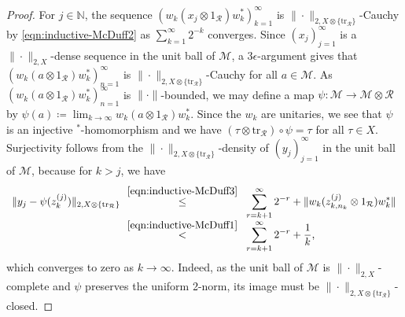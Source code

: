 \documentclass[10pt,a4paper]{amsart}
\newcommand{\M}{\mathcal{M}}
\newcommand{\N}{\mathbb N}
\newcommand{\R}{\mathcal R}
\newcommand{\tr}{\mathrm{tr}}
\begin{document}
\begin{proof}
For $j \in \N$, the sequence $(w_k (x_j \otimes 1_\R) w_k^*)_{k=1}^\infty$ is $\|\cdot\|_{2,X \otimes \{\tr_\R\}}$-Cauchy by \eqref{eqn:inductive-McDuff2} as $\sum_{k=1}^\infty 2^{-k}$ converges. Since $(x_j)_{j=1}^\infty$ is  a $\|\cdot\|_{2,X}$-dense sequence in the unit ball of $\M$, a $3\epsilon$-argument gives that  $(w_k (a \otimes 1_\R) w_k^*)_{n=1}^\infty$ is $\|\cdot\|_{2,X \otimes \{\tr_\R\}}$-Cauchy for all $a \in \M$. As $(w_k (a \otimes 1_\R) w_k^*)_{n=1}^\infty$ is $\|\cdot\|$-bounded, we may define a map $\psi\colon \M \rightarrow \M \otimes \R$ by $\psi(a) \coloneqq \lim_{k\to\infty} w_k (a \otimes 1_\R) w_k^*$. Since the $w_k$ are unitaries, we see that $\psi$ is an injective $^*$-homomorphism and we have $(\tau \otimes \tr_{\R}) \circ \psi = \tau$ for all $\tau \in X$. Surjectivity follows from the $\|\cdot\|_{2,X \otimes \{\tr_\R\}}$-density of $(y_j)_{j=1}^\infty$ in the unit ball of $\M$, because for $k > j$, we have
\begin{equation}\begin{array}{rcl}
	\|y_j - \psi(z^{(j)}_k)\|_{2,X \otimes \{\tr_\R\}} \!\! &\stackrel{\eqref{eqn:inductive-McDuff3}}{\leq}& \!\displaystyle\sum_{r=k+1}^\infty 2^{-r} + \|w_k(z^{(j)}_{k,n_k} \otimes 1_{\R})w_k^*\|  \\
	&\stackrel{\eqref{eqn:inductive-McDuff1}}{<}& \!\displaystyle\sum_{r=k+1}^\infty 2^{-r} + \frac{1}{k},
\end{array}\end{equation} 
which converges to zero as $k \to \infty$. Indeed, as the unit ball of $\M$ is \mbox{$\|\cdot\|_{2,X}$}-complete and $\psi$ preserves the uniform 2-norm, its image must be \mbox{$\|\cdot\|_{2,X \otimes \{\tr_\R\}}$}-closed.
\end{proof}
\end{document}
